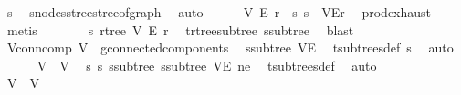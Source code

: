 \begin{isabellebody}
\ s{}\ \isamarkupfalse%
\ s{}{\isachardot}{\kern0pt}nodes{\isacharunderscore}{\kern0pt}stree{\isacharunderscore}{\kern0pt}stree{\isacharunderscore}{\kern0pt}of{\isacharunderscore}{\kern0pt}graph\ \isamarkupfalse%
\ auto\isanewline
\ \ \ \ \isamarkupfalse%
\ V{}\ E{}\ r{}\ \ s{}{\isacharcolon}{\kern0pt}\ {\isachardoublequoteopen}s{}\ {\isacharequal}{\kern0pt}\ {\isacharparenleft}{\kern0pt}V{}{\isacharcomma}{\kern0pt}E{}{\isacharcomma}{\kern0pt}r{}{\isacharparenright}{\kern0pt}{\isachardoublequoteclose}\ \isamarkupfalse%
\ prod{\isachardot}{\kern0pt}exhaust\ \isamarkupfalse%
\ metis\isanewline
\ \ \ \ \isamarkupfalse%
\ \isamarkupfalse%
\ s{}{\isacharcolon}{\kern0pt}\ rtree\ V{}\ E{}\ r{}\ \isamarkupfalse%
\ t{\isachardot}{\kern0pt}rtree{\isacharunderscore}{\kern0pt}subtree\ s{}{\isacharunderscore}{\kern0pt}subtree\ \isamarkupfalse%
\ blast\isanewline
\ \ \ \ \isamarkupfalse%
\ V{}{\isacharunderscore}{\kern0pt}conn{\isacharunderscore}{\kern0pt}comp{\isacharcolon}{\kern0pt}\ {\isachardoublequoteopen}V{}\ {\isasymin}\ g{\isacharprime}{\kern0pt}{\isachardot}{\kern0pt}connected{\isacharunderscore}{\kern0pt}components{\isachardoublequoteclose}\ \isamarkupfalse%
\ s{}{\isacharunderscore}{\kern0pt}subtree\ VE{\isacharprime}{\kern0pt}\ \isamarkupfalse%
\ t{\isachardot}{\kern0pt}subtrees{\isacharunderscore}{\kern0pt}def\ s{}\ \isamarkupfalse%
\ auto\isanewline
\ \ \ \ \isamarkupfalse%
\ {\isachardoublequoteopen}V{}\ {\isasymnoteq}\ V{}{\isachardoublequoteclose}\ \isamarkupfalse%
\ s{}\ s{}\ s{}{\isacharunderscore}{\kern0pt}subtree\ s{}{\isacharunderscore}{\kern0pt}subtree\ VE{\isacharprime}{\kern0pt}\ ne\ \isamarkupfalse%
\ t{\isachardot}{\kern0pt}subtrees{\isacharunderscore}{\kern0pt}def\ \isamarkupfalse%
\ auto\isanewline
\ \ \ \ \isamarkupfalse%
\ \isamarkupfalse%
\ {\isachardoublequoteopen}V{}\ {\isasyminter}\ V{}\ {\isacharequal}{\kern0pt}\ {\isacharbraceleft}{\kern0pt}{\isacharbraceright}{\kern0pt}{\isachardoublequoteclose}\ \isamarkupfalse%

\end{isabellebody}
